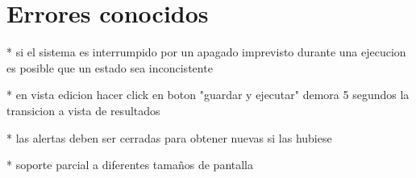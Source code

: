 \section{Errores conocidos}





* si el sistema es interrumpido por un apagado imprevisto durante una ejecucion 
    es posible que un estado sea inconcistente

* en vista edicion hacer click en boton "guardar y ejecutar" demora 5 segundos la transicion a 
    vista de resultados

* las alertas deben ser cerradas para obtener nuevas si las hubiese

* soporte parcial a diferentes tamaños de pantalla
